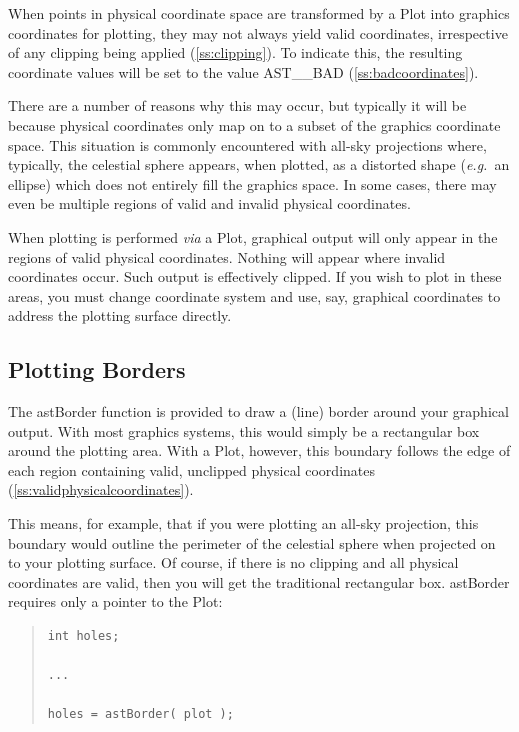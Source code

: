 \documentclass[twoside,11pt]{article}
\newcommand{\htmlref}[2]{#1}
\newcommand{\secref}[1]{\S\ref{#1}}
\renewcommand{\secref}[1]{\ref{#1}}
\begin{document}
When points in physical coordinate space are transformed by a \htmlref{Plot}{Plot}
into graphics coordinates for plotting, they may not always yield
valid coordinates, irrespective of any clipping being applied
(\secref{ss:clipping}). To indicate this, the resulting coordinate
values will be set to the value AST\_\_BAD
(\secref{ss:badcoordinates}).

There are a number of reasons why this may occur, but typically it
will be because physical coordinates only map on to a subset of the
graphics coordinate space. This situation is commonly encountered with
all-sky projections where, typically, the celestial sphere appears,
when plotted, as a distorted shape ({\em{e.g.}}\ an ellipse) which
does not entirely fill the graphics space. In some cases, there may
even be multiple regions of valid and invalid physical coordinates.

When plotting is performed {\em{via}} a Plot, graphical output will
only appear in the regions of valid physical coordinates. Nothing will
appear where invalid coordinates occur. Such output is effectively
clipped. If you wish to plot in these areas, you must change
coordinate system and use, say, graphical coordinates to address the
plotting surface directly.

\subsection{Plotting Borders}

The \htmlref{astBorder}{astBorder} function is provided to draw a (line) border around your
graphical output. With most graphics systems, this would simply be a
rectangular box around the plotting area. With a \htmlref{Plot}{Plot}, however, this
boundary follows the edge of each region containing valid, unclipped
physical coordinates (\secref{ss:validphysicalcoordinates}).

This means, for example, that if you were plotting an all-sky
projection, this boundary would outline the perimeter of the celestial
sphere when projected on to your plotting surface. Of course, if there
is no clipping and all physical coordinates are valid, then you will
get the traditional rectangular box. astBorder requires only
a pointer to the Plot:

\begin{quote}
\small
\begin{verbatim}
int holes;

...

holes = astBorder( plot );
\end{verbatim}
\normalsize
\end{quote}
\end{document}
